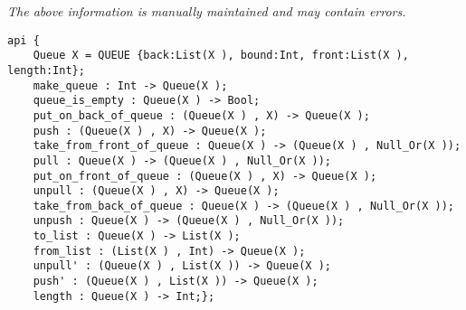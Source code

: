\label{api:Bounded\_Queue}

{\tiny \it The above information is manually maintained and may contain errors.}
\begin{verbatim}
api {
    Queue X = QUEUE {back:List(X ), bound:Int, front:List(X ), length:Int};
    make_queue : Int -> Queue(X );
    queue_is_empty : Queue(X ) -> Bool;
    put_on_back_of_queue : (Queue(X ) , X) -> Queue(X );
    push : (Queue(X ) , X) -> Queue(X );
    take_from_front_of_queue : Queue(X ) -> (Queue(X ) , Null_Or(X ));
    pull : Queue(X ) -> (Queue(X ) , Null_Or(X ));
    put_on_front_of_queue : (Queue(X ) , X) -> Queue(X );
    unpull : (Queue(X ) , X) -> Queue(X );
    take_from_back_of_queue : Queue(X ) -> (Queue(X ) , Null_Or(X ));
    unpush : Queue(X ) -> (Queue(X ) , Null_Or(X ));
    to_list : Queue(X ) -> List(X );
    from_list : (List(X ) , Int) -> Queue(X );
    unpull' : (Queue(X ) , List(X )) -> Queue(X );
    push' : (Queue(X ) , List(X )) -> Queue(X );
    length : Queue(X ) -> Int;};
\end{verbatim}
